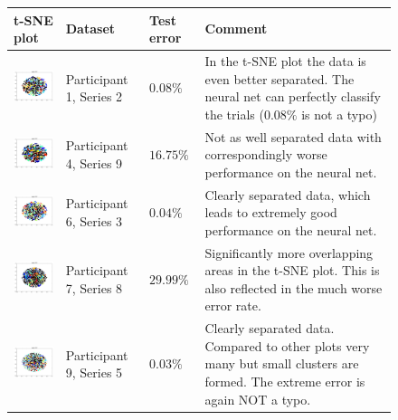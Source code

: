 \documentclass{article} %
\begin{document}
\begin{figure}
	\centering
	\begin{tabular}{|m{3cm}|m{2.2cm}|m{1cm}|m{8cm}|}
		\hline  \textbf{t-SNE plot} & \textbf{Dataset} & \textbf{Test error} & \textbf{Comment} \\ 
		\hline \rule{0pt}{15ex}\includegraphics[width=3cm]{eegP1S2.jpg} & Participant 1, Series 2 & $0.08\%$ & In the t-SNE plot the data is even better separated. The neural net can perfectly classify the trials ($0.08\%$ is not a typo)\\ 
		\hline \rule{0pt}{15ex}\includegraphics[width=3cm]{eegP4S9.jpg} & Participant 4, Series 9 & $16.75\%$ & Not as well separated data with correspondingly worse performance on the neural net. \\ 
		\hline \rule{0pt}{15ex}\includegraphics[width=3cm]{eegP6S3.jpg} & Participant 6, Series 3 & $0.04\%$ & Clearly separated data, which leads to extremely good performance on the neural net. \\ 
		\hline \rule{0pt}{15ex}\includegraphics[width=3cm]{eegP7S8.jpg} & Participant 7, Series 8 & $29.99\%$ & Significantly more overlapping areas in the t-SNE plot. This is also reflected in the much worse error rate. \\ 
		\hline \rule{0pt}{15ex}\includegraphics[width=3cm]{eegP9S5.jpg} & Participant 9, Series 5 & $0.03\%$ & Clearly separated data. Compared to other plots very many but small clusters are formed. The extreme error is again NOT a typo. \\  

\end{tabular}
\end{figure}
\end{document}
